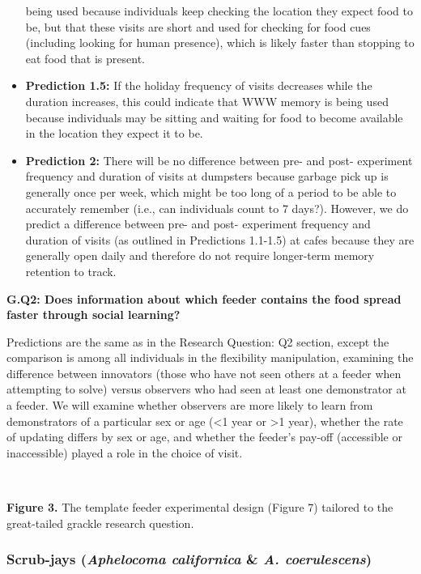 \documentclass[
]{article}
\begin{document}
\begin{itemize}
  being used because individuals keep checking the location they expect
  food to be, but that these visits are short and used for checking for
  food cues (including looking for human presence), which is likely
  faster than stopping to eat food that is present.
\item
  \textbf{Prediction 1.5:} If the holiday frequency of visits decreases
  while the duration increases, this could indicate that WWW memory is
  being used because individuals may be sitting and waiting for food to
  become available in the location they expect it to be.
\item
  \textbf{Prediction 2:} There will be no difference between pre- and
  post- experiment frequency and duration of visits at dumpsters because
  garbage pick up is generally once per week, which might be too long of
  a period to be able to accurately remember (i.e., can individuals
  count to 7 days?). However, we do predict a difference between pre-
  and post- experiment frequency and duration of visits (as outlined in
  Predictions 1.1-1.5) at cafes because they are generally open daily
  and therefore do not require longer-term memory retention to track.
\end{itemize}

\textbf{G.Q2: Does information about which feeder contains the food
spread faster through social learning?}

Predictions are the same as in the Research Question: Q2 section, except
the comparison is among all individuals in the flexibility manipulation,
examining the difference between innovators (those who have not seen
others at a feeder when attempting to solve) versus observers who had
seen at least one demonstrator at a feeder. We will examine whether
observers are more likely to learn from demonstrators of a particular
sex or age (\textless1 year or \textgreater1 year), whether the rate of
updating differs by sex or age, and whether the feeder's pay-off
(accessible or inaccessible) played a role in the choice of visit.

~

\textbf{Figure 3.} The template feeder experimental design (Figure 7)
tailored to the great-tailed grackle research question.

\hypertarget{scrub-jays-aphelocoma-californica-a.-coerulescens}{%
\subsubsection{\texorpdfstring{Scrub-jays (\emph{Aphelocoma californica}
\& \emph{A.
coerulescens})}{Scrub-jays (Aphelocoma californica \& A. coerulescens)}}\label{scrub-jays-aphelocoma-californica-a.-coerulescens}}
\end{document}

